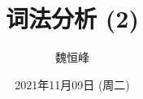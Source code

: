 \documentclass[]{beamer}
\title[词法分析]{词法分析 (2)}
\author[魏恒峰]{\large 魏恒峰}
\institute{hfwei@nju.edu.cn}
\date{2021年11月09日 (周二)}
\begin{document}
\maketitle

% 

\thankyou{}

\end{document}
